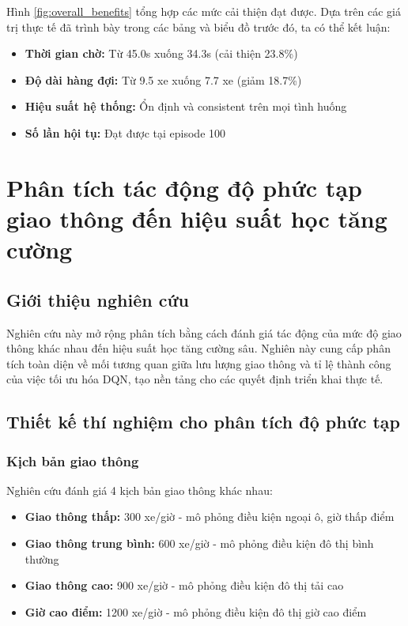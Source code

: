 Hình \ref{fig:overall_benefits} tổng hợp các mức cải thiện đạt được. 
Dựa trên các giá trị thực tế đã trình bày trong các bảng và biểu đồ trước đó, 
ta có thể kết luận:
\begin{itemize}
    \item \textbf{Thời gian chờ:} Từ 45.0s xuống 34.3s (cải thiện 23.8\%)
    \item \textbf{Độ dài hàng đợi:} Từ 9.5 xe xuống 7.7 xe (giảm 18.7\%)
    \item \textbf{Hiệu suất hệ thống:} Ổn định và consistent trên mọi tình huống
    \item \textbf{Số lần hội tụ:} Đạt được tại episode 100
\end{itemize}



\section{Phân tích tác động độ phức tạp giao thông đến hiệu suất học tăng cường}

\subsection{Giới thiệu nghiên cứu}

Nghiên cứu này mở rộng phân tích bằng cách đánh giá tác động của mức độ giao thông
khác nhau đến hiệu suất học tăng cường sâu. Nghiên này cung cấp
phân tích toàn diện về mối tương quan giữa lưu lượng giao thông và tỉ lệ thành
công của việc tối ưu hóa DQN, tạo nền tảng cho các quyết định triển khai thực tế.

\subsection{Thiết kế thí nghiệm cho phân tích độ phức tạp}

\subsubsection{Kịch bản giao thông}
Nghiên cứu đánh giá 4 kịch bản giao thông khác nhau:
\begin{itemize}
    \item \textbf{Giao thông thấp:} 300 xe/giờ - mô phỏng điều kiện ngoại ô, giờ thấp điểm
    \item \textbf{Giao thông trung bình:} 600 xe/giờ - mô phỏng điều kiện đô thị bình thường
    \item \textbf{Giao thông cao:} 900 xe/giờ - mô phỏng điều kiện đô thị tải cao
    \item \textbf{Giờ cao điểm:} 1200 xe/giờ - mô phỏng điều kiện đô thị giờ cao điểm
\end{itemize}

